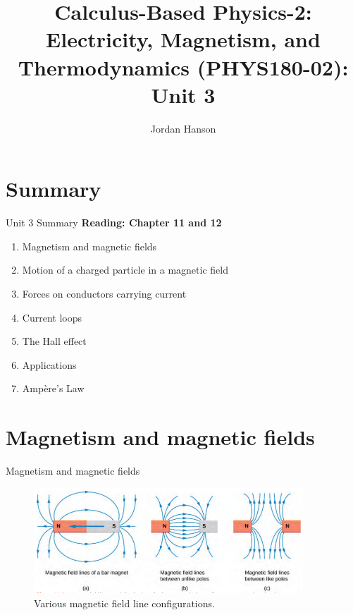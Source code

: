 \documentclass{beamer}
\title{Calculus-Based Physics-2: Electricity, Magnetism, and Thermodynamics (PHYS180-02): Unit 3}
\author{Jordan Hanson}
\institute{Whittier College Department of Physics and Astronomy}
\begin{document}
\maketitle

\section{Summary}

\begin{frame}{Unit 3 Summary}
\textbf{Reading: Chapter 11 and 12}
\begin{enumerate}
\item Magnetism and magnetic fields
\item Motion of a charged particle in a magnetic field
\item Forces on conductors carrying current
\item Current loops
\item The Hall effect
\item Applications
\item Amp\`{e}re's Law
\end{enumerate}
\end{frame}

\section{Magnetism and magnetic fields}

\begin{frame}{Magnetism and magnetic fields}
\begin{figure}
\centering
\includegraphics[width=0.9\textwidth,trim=0cm 1cm 0cm 0cm,clip=true]{figures/fields1.png}
\caption{\label{fields1} Various magnetic field line configurations.}
\end{figure}
\end{frame}
\end{document}

